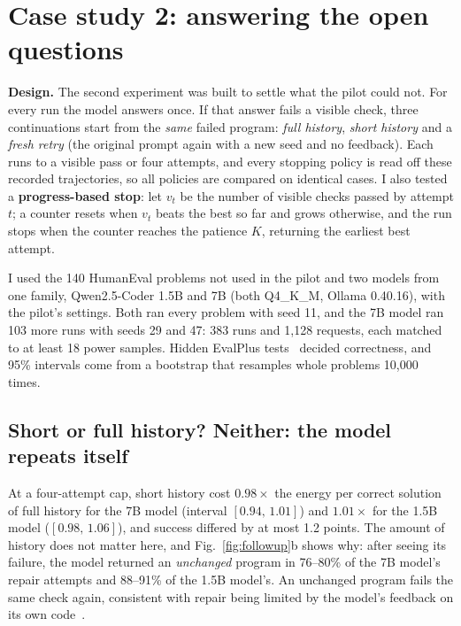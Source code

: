 \documentclass[11pt,a4paper]{article}
\begin{document}
\section{Case study 2: answering the open questions}\label{sec:followup}
\textbf{Design.} The second experiment was built to settle what the pilot could not. For every run the model answers once. If that answer fails a visible check, three continuations start from the \emph{same} failed program: \emph{full history}, \emph{short history} and a \emph{fresh retry} (the original prompt again with a new seed and no feedback). Each runs to a visible pass or four attempts, and every stopping policy is read off these recorded trajectories, so all policies are compared on identical cases. I also tested a \textbf{progress-based stop}: let $v_t$ be the number of visible checks passed by attempt $t$; a counter resets when $v_t$ beats the best so far and grows otherwise, and the run stops when the counter reaches the patience $K$, returning the earliest best attempt.

I used the 140 HumanEval problems not used in the pilot and two models from one family, Qwen2.5-Coder 1.5B and 7B (both Q4\_K\_M, Ollama 0.40.16), with the pilot's settings. Both ran every problem with seed 11, and the 7B model ran 103 more runs with seeds 29 and 47: 383 runs and 1{,}128 requests, each matched to at least 18 power samples. Hidden EvalPlus tests~\cite{liu2023evalplus} decided correctness, and 95\% intervals come from a bootstrap that resamples whole problems 10{,}000 times.

\subsection{Short or full history? Neither: the model repeats itself}
At a four-attempt cap, short history cost $0.98\times$ the energy per correct solution of full history for the 7B model (interval $[0.94,\,1.01]$) and $1.01\times$ for the 1.5B model ($[0.98,\,1.06]$), and success differed by at most 1.2 points. The amount of history does not matter here, and Fig.~\ref{fig:followup}b shows why: after seeing its failure, the model returned an \emph{unchanged} program in 76--80\% of the 7B model's repair attempts and 88--91\% of the 1.5B model's. An unchanged program fails the same check again, consistent with repair being limited by the model's feedback on its own code~\cite{olausson2024selfrepair}.
\end{document}
